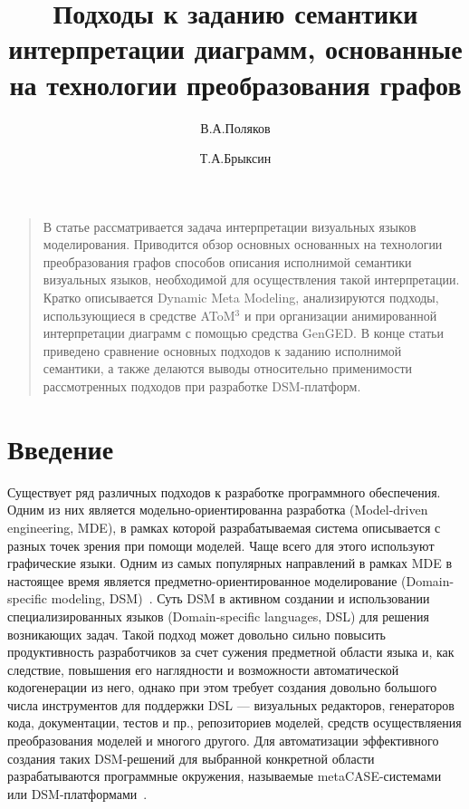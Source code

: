 \documentclass[a5paper]{article}
\title{Подходы к заданию семантики интерпретации диаграмм, основанные на технологии преобразования графов}
\author{В.А.Поляков \and Т.А.Брыксин}
\date{}
\begin{document}
\maketitle
\thispagestyle{empty}

\begin{quote}
\small\noindent
В статье рассматривается задача интерпретации визуальных языков моделирования. Приводится обзор основных основанных на технологии преобразования графов способов описания исполнимой семантики визуальных языков, необходимой для осуществления такой интерпретации. Кратко описывается Dynamic Meta Modeling, анализируются подходы, использующиеся в средстве AToM$^3$ и при организации анимированной интерпретации диаграмм с помощью средства GenGED. В конце статьи приведено сравнение основных подходов к заданию исполнимой семантики, а также делаются выводы относительно применимости рассмотренных подходов при разработке DSM-платформ.
\end{quote}

\section*{Введение}

Существует ряд различных подходов к разработке программного обеспечения. Одним из них является модельно-ориентированна разработка (Model-driven engineering, MDE), в рамках которой разрабатываемая система описывается с разных точек зрения при помощи моделей. Чаще всего для этого используют графические языки. Одним из самых популярных направлений в рамках MDE в настоящее время является предметно-ориентированное моделирование (Domain-specific modeling, DSM)~\cite{koznov1, koznov2, dsmbook}. Суть DSM в активном создании и использовании специализированных языков (Domain-specific languages, DSL) для решения возникающих задач. Такой подход может довольно сильно повысить продуктивность разработчиков за счет сужения предметной области языка и, как следствие, повышения его наглядности и возможности автоматической кодогенерации из него, однако при этом требует создания довольно большого числа инструментов для поддержки DSL --- визуальных редакторов, генераторов кода, документации, тестов и пр., репозиториев моделей, средств осуществляения преобразования моделей и многого другого. Для автоматизации эффективного создания таких DSM-решений для выбранной конкретной области разрабатываются программные окружения, называемые metaCASE-системами или DSM-платформами~\cite{dsm1, dsm4}. 
\end{document}
